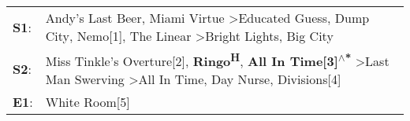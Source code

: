 \begin{supertabular}{p{0.03\textwidth}p{0.92\textwidth}}
 \textbf{S1}:  &                                Andy's Last Beer\textsuperscript{}, \enspace Miami Virtue\textsuperscript{} \textgreater \enspace Educated Guess\textsuperscript{}, \enspace Dump City\textsuperscript{}, \enspace Nemo[1]\textsuperscript{}, \enspace The Linear\textsuperscript{} \textgreater \enspace Bright Lights, Big City\textsuperscript{}  \enspace  \\
 \textbf{S2}:  &  Miss Tinkle's Overture[2]\textsuperscript{}, \enspace \textbf{Ringo\textsuperscript{H}}, \enspace \textbf{All In Time[3]\textsuperscript{$\wedge$*}} \textgreater \enspace Last Man Swerving\textsuperscript{} \textgreater \enspace All In Time\textsuperscript{}, \enspace Day Nurse\textsuperscript{}, \enspace Divisions[4]\textsuperscript{}  \enspace  \\
 \textbf{E1}:  &                                                                                                                                                                                                                                                                                                                    White Room[5]\textsuperscript{}  \enspace  \\
\end{supertabular}
